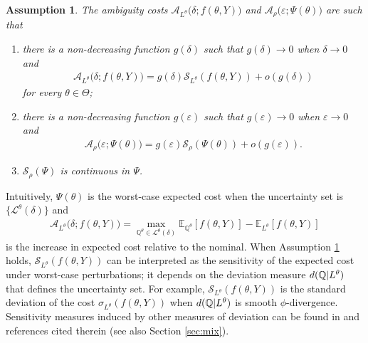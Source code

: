 \documentclass[10pt,a4paper]{amsart}
\newtheorem{assumption}[theorem]{Assumption}
\numberwithin{equation}{section}
\numberwithin{theorem}{section}
\numberwithin{table}{section}
\numberwithin{figure}{section}
\begin{document}
\begin{assumption} \label{ass:Bayes}
The ambiguity costs ${\mathcal A}_{L^\theta}\big(\delta; f(\theta, Y)\big)$  and ${\mathcal A}_{\rho}\big(\varepsilon; \Psi(\theta)\big)$ are such that 
\begin{enumerate}
\item there is a non-decreasing function $g(\delta)$ such that $g(\delta)\rightarrow 0$ when $\delta\rightarrow 0$ and 
\begin{eqnarray*}
{\mathcal A}_{L^\theta}\big(\delta; f(\theta, Y)\big) %
   =  g(\delta) {\mathcal S}_{L^\theta}(f(\theta, Y))+ o(g(\delta))
\end{eqnarray*}
for every $\theta\in{\Theta}$;
\item there is a non-decreasing function $g(\varepsilon)$ such that $g(\varepsilon)\rightarrow 0$ when $\varepsilon\rightarrow 0$ and 
\begin{eqnarray*}
{\mathcal A}_{\rho}\big(\varepsilon; \Psi(\theta)\big) %
=  %
g(\varepsilon) {\mathcal S}_\rho(\Psi(\theta)) + o(g(\varepsilon)).
\end{eqnarray*}
\item  ${\mathcal S}_{\rho}(\Psi)$ is continuous in $\Psi$. 
\end{enumerate}
\end{assumption}

Intuitively, $\Psi(\theta)$ is the worst-case expected cost when  the uncertainty set  is $\{{\mathcal L}^\theta(\delta)\}$ and
\begin{eqnarray*}
{\mathcal A}_{L^\theta}\big(\delta; f(\theta, Y)\big)= \max_{{\mathbb Q}^\theta \in {\mathcal L}^\theta(\delta)} {\mathbb E}_{{\mathbb Q}^\theta} [f(\theta, Y)] 
   -   {\mathbb E}_{L^\theta}[f(\theta, Y)]
   \end{eqnarray*} 
is the  increase in expected cost relative to the nominal. When Assumption \ref{ass:Bayes} holds,  ${\mathcal S}_{L^\theta}(f(\theta, Y))$  can be interpreted as the  sensitivity of the expected cost under worst-case perturbations; it depends on the deviation measure ${\rm d}({\mathbb Q} | L^\theta)$ that defines the uncertainty set. For example, ${\mathcal S}_{L^\theta}(f(\theta, Y))$ is the standard deviation of the cost $\sigma_{L^\theta} (f(\theta, Y))$ when ${\rm d}({\mathbb Q}|L^\theta)$ is smooth $\phi$-divergence. Sensitivity measures induced by other measures of deviation can be found in \cite{gotoh2026sensitivity} and references cited therein (see also Section \ref{sec:mix}).
   
\end{document}
